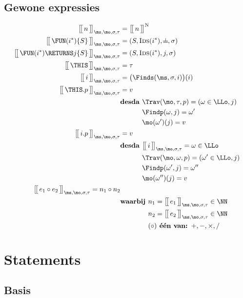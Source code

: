 \subsection{Gewone expressies}
%
\begin{align*}
  \Express{n}{\ms,\mo,\sigma,\tau} &= \Express[N]{n}{} \\
  \Express{\FUN (i^*) \{S\}}{\ms,\mo,\sigma,\tau} &= (S, \textsc{Ids}(i^*), \nil, \sigma) \\
  \Express{\FUN (i^*) \RETURNS j \{S\}}{\ms,\mo,\sigma,\tau} &= (S, \textsc{Ids}(i^*), j, \sigma) \\
  \Express{\THIS}{\ms,\mo,\sigma,\tau} &= \tau \\
  \Express{i}{\ms,\mo,\sigma,\tau} &= \big( \Finds(\ms, \sigma, i) \big)(i) \\
  \Express{\THIS.p}{\ms,\mo,\sigma,\tau} &= v \\
  & \textbf{desda } \Trav(\mo, \tau, p) = (\omega \in \LLo, j) \\
  & \phantom{\textbf{desda }} \Findp(\omega,j) = \omega' \\
  & \phantom{\textbf{desda }} \mo(\omega')(j) = v \\
  \Express{i.p}{\ms,\mo,\sigma,\tau} &= v \\
  & \textbf{desda } \Express{i}{\ms,\mo,\sigma,\tau} = \omega \in \LLo \\
  & \phantom{\textbf{desda }} \Trav(\mo, \omega, p) = (\omega' \in \LLo, j) \\
  & \phantom{\textbf{desda }} \Findp(\omega',j) = \omega'' \\
  & \phantom{\textbf{desda }} \mo(\omega'')(j) = v \\
  \Express{e_1 \circ e_2}{\ms,\mo,\sigma,\tau} = n_1 \circ n_2 \\
  & \textbf{waarbij } n_1 = \Express{e_1}{\ms,\mo,\sigma,\tau} \in \NN \\
  & \phantom{\textbf{waarbij }} n_2 = \Express{e_2}{\ms,\mo,\sigma,\tau} \in \NN \\
  & \phantom{\textbf{waarbij }} (\circ) \textbf{ één van: } +, -, \times, /
\end{align*}

\section{Statements}

\subsection{Basis}

